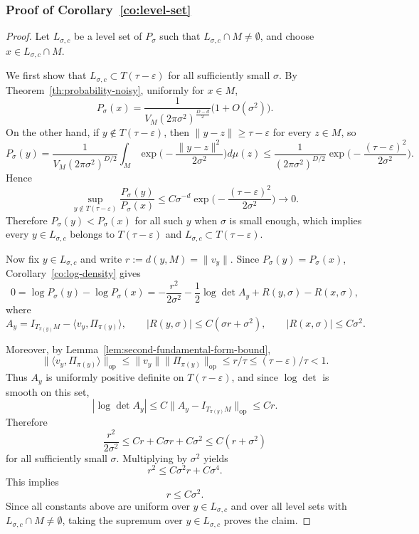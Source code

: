 \documentclass[11pt]{article}
\theoremstyle{plain}
\theoremstyle{definition}
\begin{document}
\subsubsection{Proof of Corollary~\ref{co:level-set}}\label{sec:pf-level set} 
\begin{proof} 
Let $L_{\sigma,c}$ be a level set of $P_\sigma$ such that $L_{\sigma,c}\cap M\neq\emptyset$, and choose $x\in L_{\sigma,c}\cap M$.

We first show that $L_{\sigma,c}\subset T(\tau-\varepsilon)$ for all sufficiently small $\sigma$. By Theorem~\ref{th:probability-noisy}, uniformly for $x\in M$,
\[
P_\sigma(x)
=
\frac{1}{V_M(2\pi\sigma^2)^{\frac{D-d}{2}}}\big(1+O(\sigma^2)\big).
\]
On the other hand, if $y\notin T(\tau-\varepsilon)$, then $\|y-z\|\ge \tau-\varepsilon$ for every $z\in M$, so
\[
P_\sigma(y)
=
\frac{1}{V_M(2\pi\sigma^2)^{D/2}}
\int_M \exp\big(-\frac{\|y-z\|^2}{2\sigma^2}\big)d\mu(z)
\le
\frac{1}{(2\pi\sigma^2)^{D/2}}
\exp\big(-\frac{(\tau-\varepsilon)^2}{2\sigma^2}\big).
\]
Hence
\[
\sup_{y\notin T(\tau-\varepsilon)}\frac{P_\sigma(y)}{P_\sigma(x)}
\le
C \sigma^{-d}
\exp\big(-\frac{(\tau-\varepsilon)^2}{2\sigma^2}\big)\to 0.
\]
Therefore $P_\sigma(y)<P_\sigma(x)$ for all such $y$ when $\sigma$ is small enough, which implies every $y\in L_{\sigma,c}$ belongs to $T(\tau-\varepsilon)$ and $L_{\sigma,c}\subset T(\tau-\varepsilon)$.


Now fix $y\in L_{\sigma,c}$ and write $r:=d(y,M)=\|v_y\|$. Since $P_\sigma(y)=P_\sigma(x)$, Corollary~\ref{co:log-density} gives
\[
0=\log P_\sigma(y)-\log P_\sigma(x)
=-\frac{r^2}{2\sigma^2}-\frac12\log\det A_y+R(y,\sigma)-R(x,\sigma),
\]
where
\[
A_y=I_{T_{\pi(y)}M}-\langle v_y,\Pi_{\pi(y)}\rangle,
\qquad
|R(y,\sigma)|\le C(\sigma r+\sigma^2),
\qquad
|R(x,\sigma)|\le C\sigma^2.
\]

Moreover, by Lemma~\ref{lem:second-fundamental-form-bound},
\[
\|\langle v_y,\Pi_{\pi(y)}\rangle\|_{\mathrm{op}}
\le \|v_y\|\|\Pi_{\pi(y)}\|_{\mathrm{op}}
\le r/\tau
\le (\tau-\varepsilon)/\tau<1.
\]
Thus $A_y$ is uniformly positive definite on $T(\tau-\varepsilon)$, and since $\log\det$ is smooth on this set,
\[
|\log\det A_y|\le C\|A_y-I_{T_{\pi(y)}M}\|_{\mathrm{op}}\le Cr.
\]
Therefore
\[
\frac{r^2}{2\sigma^2}
\le C r + C\sigma r + C\sigma^2
\le C(r+\sigma^2)
\]
for all sufficiently small $\sigma$. Multiplying by $\sigma^2$ yields
\[
r^2\le C\sigma^2 r + C\sigma^4.
\]
This implies
\[
r \le C\sigma^2.
\]
Since all constants above are uniform over $y\in L_{\sigma,c}$ and over all level sets with $L_{\sigma,c}\cap M\neq\emptyset$, taking the supremum over $y\in L_{\sigma,c}$ proves the claim.
\end{proof}
\end{document}
